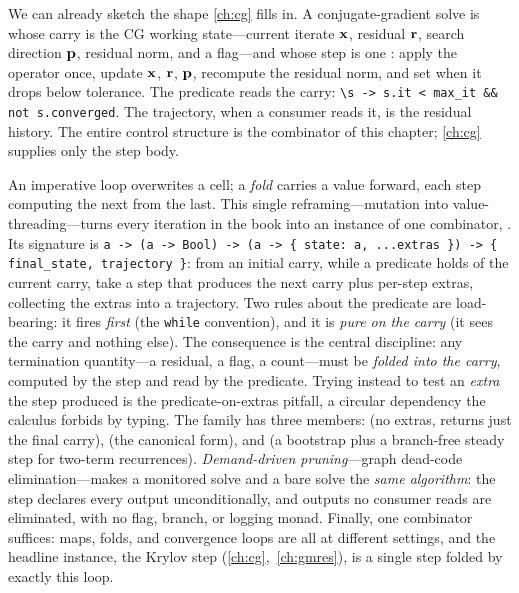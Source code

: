 \begin{example}
We can already sketch the shape \cref{ch:cg} fills in. A conjugate-gradient solve
is  whose carry is the CG working state---current iterate
$\mathbf{x}$, residual $\mathbf{r}$, search direction $\mathbf{p}$, residual norm, and a
 flag---and whose step is one : apply the
operator once, update $\mathbf{x}$, $\mathbf{r}$, $\mathbf{p}$, recompute the residual norm, and set
 when it drops below tolerance. The predicate reads the carry:
\lstinline[style=l4style]|\s -> s.it < max_it && not s.converged|. The trajectory,
when a consumer reads it, is the residual history. The entire control structure is
the combinator of this chapter; \cref{ch:cg} supplies only the step body.
\end{example}

\summarysection
An imperative loop overwrites a cell; a \emph{fold} carries a value forward,
each step computing the next from the last. This single reframing---mutation into
value-threading---turns every iteration in the book into an instance of one
combinator, . Its signature is
\lstinline[style=l4style]|a -> (a -> Bool) -> (a -> { state: a, ...extras }) -> { final_state, trajectory }|:
from an initial carry, while a predicate holds of the current carry, take a step
that produces the next carry plus per-step extras, collecting the extras into a
trajectory. Two rules about the predicate are load-bearing: it fires
\emph{first} (the \texttt{while} convention), and it is \emph{pure on the carry}
(it sees the carry and nothing else). The consequence is the central discipline:
any termination quantity---a residual, a flag, a count---must be \emph{folded into
the carry}, computed by the step and read by the predicate. Trying instead to test
an \emph{extra} the step produced is the predicate-on-extras pitfall, a circular
dependency the calculus forbids by typing. The family has three members:
 (no extras, returns just the final carry),
 (the canonical form), and
 (a bootstrap plus a branch-free steady step for
two-term recurrences). \emph{Demand-driven pruning}---graph dead-code
elimination---makes a monitored solve and a bare solve the \emph{same algorithm}:
the step declares every output unconditionally, and outputs no consumer reads are
eliminated, with no flag, branch, or logging monad. Finally, one combinator
suffices: maps, folds, and convergence loops are all  at
different settings, and the headline instance, the Krylov step
(\cref{ch:cg},~\cref{ch:gmres}), is a single step folded by exactly this loop.


